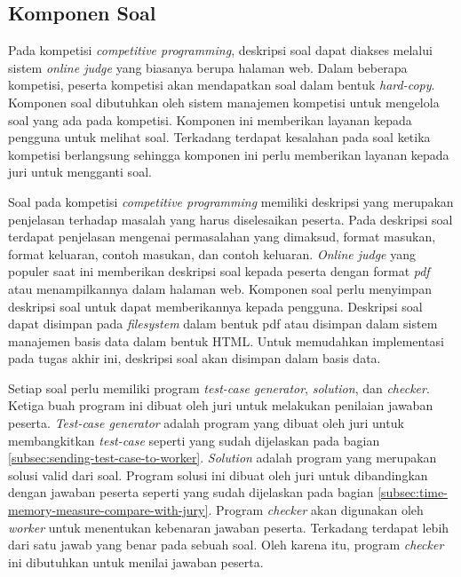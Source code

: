 \subsection{Komponen Soal}

\par Pada kompetisi \textit{competitive programming}, deskripsi soal dapat diakses melalui sistem \textit{online judge} yang biasanya berupa halaman web. Dalam beberapa kompetisi, peserta kompetisi akan mendapatkan soal dalam bentuk \textit{hard-copy}. Komponen soal dibutuhkan oleh sistem manajemen kompetisi untuk mengelola soal yang ada pada kompetisi. Komponen ini memberikan layanan kepada pengguna untuk melihat soal. Terkadang terdapat kesalahan pada soal ketika kompetisi berlangsung sehingga komponen ini perlu memberikan layanan kepada juri untuk mengganti soal.

\par Soal pada kompetisi \textit{competitive programming} memiliki deskripsi yang merupakan penjelasan terhadap masalah yang harus diselesaikan peserta. Pada deskripsi soal terdapat penjelasan mengenai permasalahan yang dimaksud, format masukan, format keluaran, contoh masukan, dan contoh keluaran. \textit{Online judge} yang populer saat ini memberikan deskripsi soal kepada peserta dengan format \textit{pdf} atau menampilkannya dalam halaman web. Komponen soal perlu menyimpan deskripsi soal untuk dapat memberikannya kepada pengguna. Deskripsi soal dapat disimpan pada \textit{filesystem} dalam bentuk pdf atau disimpan dalam sistem manajemen basis data dalam bentuk HTML. Untuk memudahkan implementasi pada tugas akhir ini, deskripsi soal akan disimpan dalam basis data.

\par Setiap soal perlu memiliki program \textit{test-case generator}, \textit{solution}, dan \textit{checker}. Ketiga buah program ini dibuat oleh juri untuk melakukan penilaian jawaban peserta. \textit{Test-case generator} adalah program yang dibuat oleh juri untuk membangkitkan \textit{test-case} seperti yang sudah dijelaskan pada bagian \ref{subsec:sending-test-case-to-worker}. \textit{Solution} adalah program yang merupakan solusi valid dari soal. Program solusi ini dibuat oleh juri untuk dibandingkan dengan jawaban peserta seperti yang sudah dijelaskan pada bagian \ref{subsec:time-memory-measure-compare-with-jury}. Program \textit{checker} akan digunakan oleh \textit{worker} untuk menentukan kebenaran jawaban peserta. Terkadang terdapat lebih dari satu jawab yang benar pada sebuah soal. Oleh karena itu, program \textit{checker} ini dibutuhkan untuk menilai jawaban peserta. 

